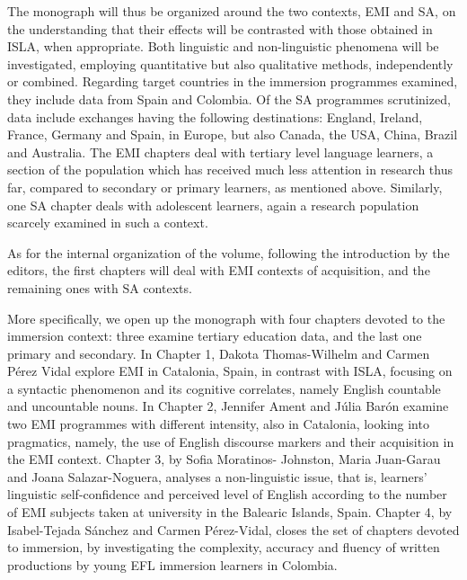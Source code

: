 \begin{styleStandard}
The monograph will thus be organized around the two contexts, EMI and SA, on the understanding that their effects will be contrasted with those obtained in ISLA, when appropriate. Both linguistic and non-linguistic phenomena will be investigated, employing quantitative but also qualitative methods, independently or combined. Regarding target countries in the immersion programmes examined, they include data from Spain and Colombia. Of the SA programmes scrutinized, data include exchanges having the following destinations: England, Ireland, France, Germany and Spain, in Europe, but also Canada, the USA, China, Brazil and Australia. The EMI chapters deal with tertiary level language learners, a section of the population which has received much less attention in research thus far, compared to secondary or primary learners, as mentioned above. Similarly, one SA chapter deals with adolescent learners, again a research population scarcely examined in such a context.
\end{styleStandard}

\begin{styleStandard}
As for the internal organization of the volume, following the introduction by the editors, the first chapters will deal with EMI contexts of acquisition, and the remaining ones with SA contexts. 
\end{styleStandard}

\begin{styleStandard}
More specifically, we open up the monograph with four chapters devoted to the immersion context: three examine tertiary education data, and the last one primary and secondary. In Chapter 1, Dakota Thomas-Wilhelm and Carmen Pérez Vidal explore EMI in Catalonia, Spain, in contrast with ISLA, focusing on a syntactic phenomenon and its cognitive correlates, namely English countable and uncountable nouns. In Chapter 2, Jennifer Ament and Júlia Barón examine two EMI programmes with different intensity, also in Catalonia, looking into pragmatics, namely, the use of English discourse markers and their acquisition in the EMI context. Chapter 3, by Sofia Moratinos- Johnston, Maria Juan-Garau and Joana Salazar-Noguera, analyses a non-linguistic issue, that is, learners’ linguistic self-confidence and perceived level of English according to the number of EMI subjects taken at university in the Balearic Islands, Spain. Chapter 4, by Isabel-Tejada Sánchez and Carmen Pérez-Vidal, closes the set of chapters devoted to immersion, by investigating the complexity, accuracy and fluency of written productions by young EFL immersion learners in Colombia.
\end{styleStandard}


